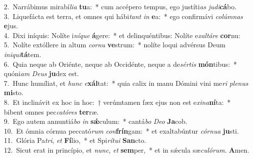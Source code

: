 {2.~}Narrábimus mirabí\textit{li}\textit{a} \textbf{tu}a:~* cum accépero tempus, ego justíti\textit{as} \textit{ju}\textit{di}\textbf{cá}bo.\\
{3.~}Liquefácta est terra, et omnes qui hábi\textit{tant} \textit{in} \textbf{e}a:~* ego confirmávi \textit{co}\textit{lúm}\textit{nas} \textbf{e}jus.\\
{4.~}Dixi iníquis: Nolíte i\textit{ní}\textit{que} \textbf{á}gere:~* et delinquéntibus: Nolíte e\textit{xal}\textit{tá}\textit{re} \textbf{cor}nu:\\
{5.~}Nolíte extóllere in altum \textit{cor}\textit{nu} \textbf{ve}strum:~* nolíte loqui advérsus Deum \textit{i}\textit{ni}\textit{qui}\textbf{tá}tem.\\
{6.~}Quia neque ab Oriénte, neque ab Occidénte, neque a de\textit{sér}\textit{tis} \textbf{món}tibus:~* quóni\textit{am} \textit{De}\textit{us} \textbf{ju}dex est.\\
{7.~}Hunc humíliat, et \textit{hunc} \textit{e}\textbf{xál}tat:~* quia calix in manu Dómini vini me\textit{ri} \textit{ple}\textit{nus} \textbf{mi}sto.\\
{8.~}Et inclinávit ex hoc in hoc:~† verúmtamen fæx ejus non est e\textit{xi}\textit{na}\textbf{ní}ta:~* bibent omnes pec\textit{ca}\textit{tó}\textit{res} \textbf{ter}ræ.\\
{9.~}Ego autem annuntiá\textit{bo} \textit{in} \textbf{sǽ}culum:~* cantá\textit{bo} \textit{De}\textit{o} \textbf{Ja}cob.\\
{10.~}Et ómnia córnua peccató\textit{rum} \textit{con}\textbf{frín}gam:~* et exaltabúntur \textit{cór}\textit{nu}\textit{a} \textbf{ju}sti.\\
{11.~}Glória Pa\textit{tri}, \textit{et} \textbf{Fí}lio,~* et Spi\textit{rí}\textit{tu}\textit{i} \textbf{San}cto.\\
{12.~}Sicut erat in princípio, et \textit{nunc}, \textit{et} \textbf{sem}per,~* et in sǽcula sæ\textit{cu}\textit{ló}\textit{rum}. \textbf{A}men.\\
